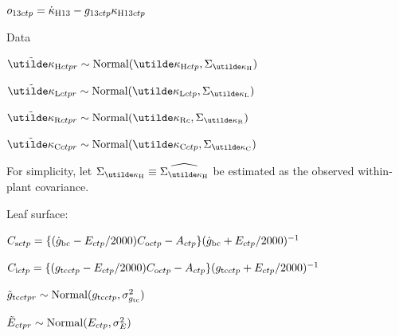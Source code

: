 \documentclass[12pt]{article}
\begin{document}
$o_{\textrm{13}ctp} = \dot{\kappa}_{\textrm{H}13} - g_{\textrm{13}ctp}\kappa_{\textrm{H}13ctp}$

\noindent
Data

$\vdatakappaH \sim \Normal(\vkappaH,\vsigkappaH)$

$\vdatakappaL \sim \Normal(\vkappaL,\vsigkappaL)$

$\vdatakappaR \sim \Normal(\vkappaR,\vsigkappaR)$

$\vdatakappaC \sim \Normal(\vkappaC,\vsigkappaC)$

For simplicity, let $\vsigkappaH\equiv\widehat{\vsigkappaH}$ be estimated as the observed within-plant
covariance.

\noindent
Leaf surface:

$C_{\textrm{s}ctp} = \{ (\dot{g}_{\textrm{bc}} - E_{ctp}/2000)C_{\textrm{o}ctp} - A_{ctp} \} ( \dot{g}_{\textrm{bc}} + E_{ctp}/2000 )^{-1}$

$C_{\textrm{i}ctp} = \{ (g_{\textrm{tc}ctp} - E_{ctp}/2000)C_{\textrm{o}ctp} - A_{ctp} \} ( g_{\textrm{tc}ctp} + E_{ctp}/2000 )^{-1}$

$\tilde{g}_{\textrm{tc}ctpr} \sim \textrm{Normal}(g_{\textrm{tc}ctp}, \sigma_{g_{\textrm{tc}}}^2)$

$\tilde{E}_{ctpr} \sim \textrm{Normal}(E_{ctp}, \sigma_{E}^2)$




\end{document}
